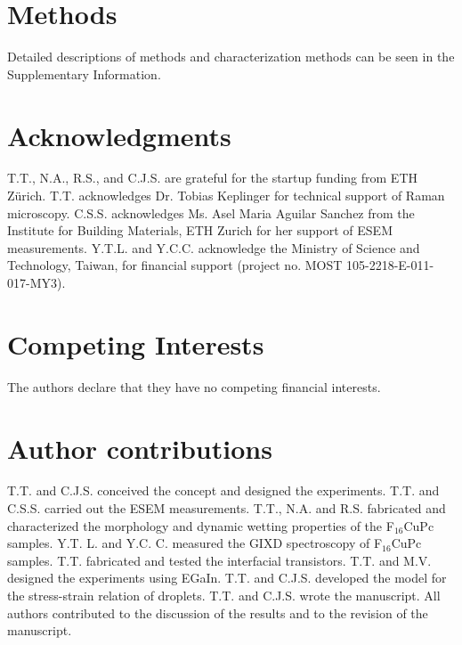 \documentclass[journal=nalefd,manuscript=letter,email=true,hyperref=true,keywords=true]{achemso}
\begin{document}
\section*{Methods}
\label{sec:orga69bd15}
Detailed descriptions of methods and characterization methods can be seen in the Supplementary Information.

\section*{Acknowledgments}
\label{sec:orgbc03a38}
T.T., N.A., R.S., and C.J.S. are grateful for the startup funding
from ETH Z\"{u}rich. T.T. acknowledges Dr. Tobias Keplinger for
technical support of Raman microscopy. C.S.S. acknowledges Ms. Asel
Maria Aguilar Sanchez from the Institute for Building Materials, ETH
Zurich for her support of ESEM measurements. Y.T.L. and
Y.C.C. acknowledge the Ministry of Science and Technology, Taiwan,
for financial support (project no. MOST 105-2218-E-011-017-MY3).

\section*{Competing Interests}
\label{sec:orgabd78a0}
The authors declare that they have no competing financial interests.

\section*{Author contributions}
\label{sec:org38399e7}
T.T. and C.J.S. conceived the concept and designed the
experiments. T.T. and C.S.S. carried out the ESEM
measurements. T.T., N.A. and R.S. fabricated and characterized the
morphology and dynamic wetting properties of the F\(_{\text{16}}\)CuPc
samples. Y.T. L. and Y.C. C. measured the GIXD spectroscopy of
F\(_{\text{16}}\)CuPc samples. T.T. fabricated and tested the interfacial
transistors. T.T. and M.V. designed the experiments using
EGaIn. T.T. and C.J.S. developed the model for the stress-strain
relation of droplets. T.T. and C.J.S. wrote the manuscript. All
authors contributed to the discussion of the results and to the
revision of the manuscript.



% 


\newpage{}
\end{document}
